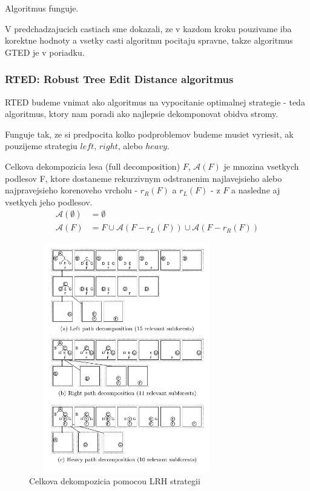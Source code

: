 \begin{dusl}
  Algoritmus funguje.
\end{dusl}

\begin{dukaz}
  V predchadzajucich castiach sme dokazali, ze v kazdom kroku pouzivame iba korektne hodnoty a
  vsetky casti algoritmu pocitaju spravne, takze algoritmus GTED je v poriadku.
\end{dukaz}


\subsubsection{RTED: Robust Tree Edit Distance algoritmus}

RTED budeme vnimat ako algoritmus na vypocitanie optimalnej strategie - teda algoritmus,
ktory nam poradi ako najlepsie dekomponovat obidva stromy.

Funguje tak, ze si predpocita kolko podproblemov budeme musiet vyriesit, ak pouzijeme strategiu
$left$, $right$, alebo $heavy$.

\begin{definice}
	Celkova dekompozicia lesa (full decomposition) $F$, $\mathcal{A}(F)$ je mnozina
	vsetkych podlesov F, ktore dostaneme rekurzivnym odstranenim najlavejsieho
	alebo najpravejsieho korenoveho vrcholu - $r_{R}(F)$ a $r_{L}(F)$ - z $F$
	a nasledne aj vsetkych jeho podlesov.
	\begin{align*}
		\mathcal{A}(\emptyset) &= \emptyset
		\\
		\mathcal{A}(F) &= {F} \cup \mathcal{A}(F - r_{L}(F)) \cup \mathcal{A}(F - r_{R}(F))
	\end{align*}
\end{definice}

\begin{figure}[H]
\centering
\includegraphics[width=85mm, height=100mm]{../img/LRH_decomposition.png}
\caption{Celkova dekompozicia pomocou LRH strategii}
\label{obr:LRH_decomposition}
\end{figure}

